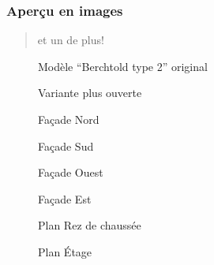 \documentclass[a4paper,12pt,french]{sphinxmanual}
\begin{document}
\subsubsection{Aperçu en images}
\label{init_su+acad/intro:apercu-en-images}\begin{quote}

et un de plus!
\end{quote}
\begin{figure}[htbp]
\centering
\capstart

\noindent{}
\caption{Modèle ``Berchtold type 2'' original}\label{init_su+acad/intro:fig-pers-porkeno}\label{init_su+acad/intro:id1}\end{figure}
\begin{figure}[htbp]
\centering
\capstart

\noindent{}
\caption{Variante plus ouverte}\label{init_su+acad/intro:id2}\end{figure}
\begin{figure}[htbp]
\centering
\capstart

\noindent{}
\caption{Façade Nord}\label{init_su+acad/intro:id3}\end{figure}
\begin{figure}[htbp]
\centering
\capstart

\noindent{}
\caption{Façade Sud}\label{init_su+acad/intro:id4}\end{figure}
\begin{figure}[htbp]
\centering
\capstart

\noindent{}
\caption{Façade Ouest}\label{init_su+acad/intro:id5}\end{figure}
\begin{figure}[htbp]
\centering
\capstart

\noindent{}
\caption{Façade Est}\label{init_su+acad/intro:id6}\end{figure}
\begin{figure}[htbp]
\centering
\capstart

\noindent{}
\caption{Plan Rez de chaussée}\label{init_su+acad/intro:id7}\end{figure}
\begin{figure}[htbp]
\centering
\capstart

\noindent{}
\caption{Plan Étage}\label{init_su+acad/intro:id8}\end{figure}
\end{document}
